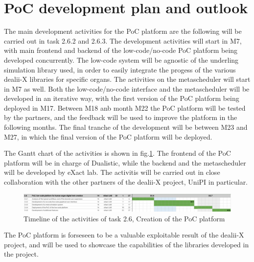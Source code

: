 \documentclass[a4paper,12pt]{article}
\begin{document}
\section{\textcolor{EUblue}{PoC development plan and outlook}}

The main development activities for the PoC platform are the following will be carried out in task 2.6.2 and 2.6.3. The development activities will start in M7, with main frontend and backend of the low-code/no-code PoC platform being developed concurrently. The low-code system will be agnostic of the underling simulation library used, in order to easily integrate the progess of the various dealii-X libraries for specific organs. The activities on the metascheduler will start in M7 as well. Both the low-code/no-code interface and the metascheduler will be developed in an iterative way, with the first version of the PoC platform being deployed in M17. Between M18 anb month M22 the PoC platform will be tested by the partners, and the feedback will be used to improve the platform in the following months. The final tranche of the development will be between M23 and M27, in which the final version of the PoC platform will be deployed.

The Gantt chart of the activities is shown in fig.\ref{gannt}. The frontend of the PoC platform will be in charge of Dualistic, while the backend and the metascheduler will be developed by eXact lab. The activitis will be carried out in close collaboration with the other partners of the dealii-X project, UniPI in particular. 
\begin{figure}
    \label{gannt}
    \includegraphics[width=400pt]{gantt.png}
    \caption{Timeline of the activities of task 2.6, Creation of the PoC platform}
\end{figure}
The PoC platform is forseseen to be a valuable exploitable result of the dealii-X project, and will be used to showcase the capabilities of the libraries developed in the project.

\label{MyLastPage}
\end{document}
